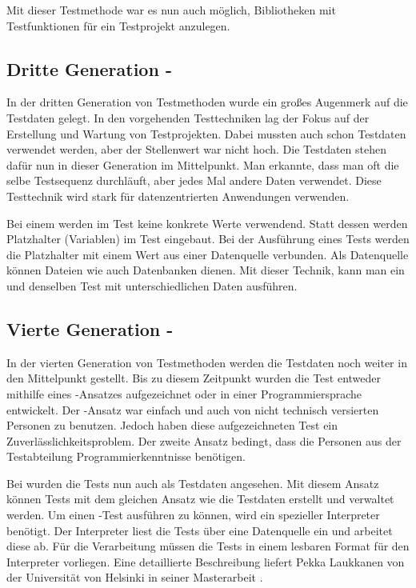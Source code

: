 \SuperPar
Mit dieser Testmethode war es nun auch möglich, Bibliotheken mit Testfunktionen für ein Testprojekt anzulegen. 

\subsection{Dritte Generation - }

In der dritten Generation von Testmethoden wurde ein großes Augenmerk auf die Testdaten gelegt. In den vorgehenden Testtechniken lag der Fokus auf der Erstellung und Wartung von Testprojekten. Dabei mussten auch schon Testdaten verwendet werden, aber der Stellenwert war nicht hoch. Die Testdaten stehen dafür nun in dieser Generation im Mittelpunkt. Man erkannte, dass man oft die selbe Testsequenz durchläuft, aber jedes Mal andere Daten verwendet. Diese Testtechnik wird stark für datenzentrierten Anwendungen verwenden. 

\SuperPar
Bei einem  werden im Test keine konkrete Werte verwendend. Statt dessen werden Platzhalter (Variablen) im Test eingebaut. Bei der Ausführung eines Tests werden die Platzhalter mit einem Wert aus einer Datenquelle verbunden. Als Datenquelle können Dateien wie auch Datenbanken dienen. Mit dieser Technik, kann man ein und denselben Test mit unterschiedlichen Daten ausführen. 

\subsection{Vierte Generation - }

In der vierten Generation von Testmethoden werden die Testdaten noch weiter in den Mittelpunkt gestellt. Bis zu diesem Zeitpunkt wurden die Test entweder mithilfe eines -Ansatzes aufgezeichnet oder in einer Programmiersprache entwickelt. Der -Ansatz war einfach und auch von nicht technisch versierten Personen zu benutzen. Jedoch haben diese aufgezeichneten Test ein Zuverlässlichkeitsproblem. Der zweite Ansatz bedingt, dass die Personen aus der Testabteilung Programmierkenntnisse benötigen.

\SuperPar
Bei  wurden die Tests nun auch als Testdaten angesehen. Mit diesem Ansatz können Tests mit dem gleichen Ansatz wie die Testdaten erstellt und verwaltet werden. Um einen -Test ausführen zu können, wird ein spezieller Interpreter benötigt. Der Interpreter liest die Tests über eine Datenquelle ein und arbeitet diese ab. Für die Verarbeitung müssen die Tests in einem lesbaren Format für den Interpreter vorliegen. Eine detaillierte Beschreibung liefert Pekka Laukkanen von der Universität von Helsinki in seiner Masterarbeit \cite{Lauk06}. 

